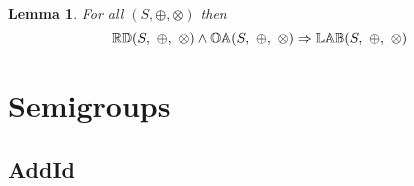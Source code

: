 \documentclass[10pt]{report}
\newcommand{\propname}[1]{{\mathbb{#1}}}
\newtheorem{lemma}{Lemma}
\begin{document}
\begin{lemma} \label{lem:rd_oa_implies_lab}
For all $(S, \oplus, \otimes)$ then
\begin{equation*}
\propname{RD}(S,\ \oplus,\ \otimes) \wedge \propname{OA}(S,\ \oplus,\ \otimes) \Rightarrow \propname{LAB}(S,\ \oplus, \ \otimes)\\
\end{equation*}
\end{lemma}





\section{Semigroups}


\subsection{AddId} 
\end{document}

